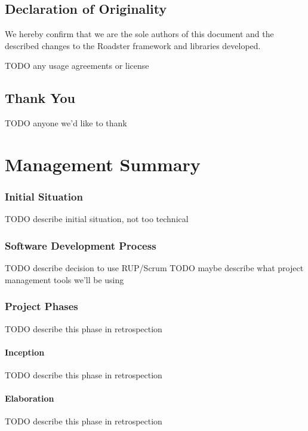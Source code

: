 \documentclass[a4paper]{report}
\begin{document}
\chapter*{Declaration of Originality}
We hereby confirm that we are the sole authors of this document and the
described changes to the Roadster framework and libraries developed.

TODO any usage agreements or license
%

\chapter*{Thank You}
TODO anyone we'd like to thank

\part*{Management Summary}\label{part:mgmtsummary}
\setcounter{secnumdepth}{0} %

\section*{Initial Situation}
TODO describe initial situation, not too technical

\section*{Software Development Process}
TODO describe decision to use RUP/Scrum
TODO maybe describe what project management tools we'll be using

\section*{Project Phases}
TODO describe this phase in retrospection

\subsection*{Inception}
TODO describe this phase in retrospection

\subsection*{Elaboration}
TODO describe this phase in retrospection
\end{document}
